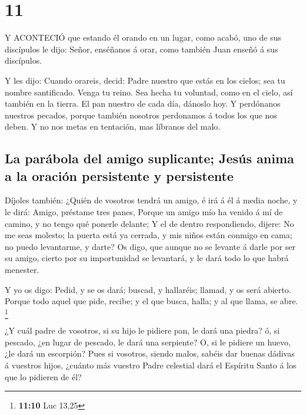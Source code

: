 \hypertarget{section-10}{%
\section{11}\label{section-10}}

 Y ACONTECIÓ que estando él orando en un lugar, como acabó,
uno de sus discípulos le dijo: Señor, enséñanos á orar, como también
Juan enseñó á sus discípulos.

 Y les dijo: Cuando orareis, decid: Padre nuestro que estás
en los cielos; sea tu nombre santificado. Venga tu reino. Sea hecha tu
voluntad, como en el cielo, así también en la tierra.  El
pan nuestro de cada día, dánoslo hoy.  Y perdónanos nuestros
pecados, porque también nosotros perdonamos á todos los que nos deben. Y
no nos metas en tentación, mas líbranos del malo.

\hypertarget{la-paruxe1bola-del-amigo-suplicante-jesuxfas-anima-a-la-oraciuxf3n-persistente-y-persistente}{%
\subsection{La parábola del amigo suplicante; Jesús anima a la oración
persistente y
persistente}\label{la-paruxe1bola-del-amigo-suplicante-jesuxfas-anima-a-la-oraciuxf3n-persistente-y-persistente}}

 Díjoles también: ¿Quién de vosotros tendrá un amigo, é irá
á él á media noche, y le dirá: Amigo, préstame tres panes, 
Porque un amigo mío ha venido á mí de camino, y no tengo qué ponerle
delante;  Y el de dentro respondiendo, dijere: No me seas
molesto; la puerta está ya cerrada, y mis niños están conmigo en cama;
no puedo levantarme, y darte?  Os digo, que aunque no se
levante á darle por ser su amigo, cierto por su importunidad se
levantará, y le dará todo lo que habrá menester.

 Y yo os digo: Pedid, y se os dará; buscad, y hallaréis;
llamad, y os será abierto.  Porque todo aquel que pide,
recibe; y el que busca, halla; y al que llama, se abre. \footnote{\textbf{11:10}
  Luc 13,25}

 ¿Y cuál padre de vosotros, si su hijo le pidiere pan, le
dará una piedra? ó, si pescado, ¿en lugar de pescado, le dará una
serpiente?  O, si le pidiere un huevo, ¿le dará un
escorpión?  Pues si vosotros, siendo malos, sabéis dar
buenas dádivas á vuestros hijos, ¿cuánto más vuestro Padre celestial
dará el Espíritu Santo á los que lo pidieren de él?

